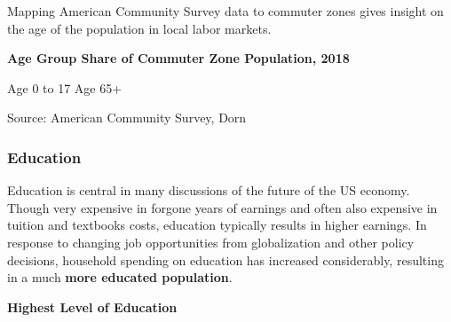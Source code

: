 \documentclass{report}
\newcommand{\tbllink}[1]{\href{https://raw.githubusercontent.com/bdecon/US-chartbook/master/chartbook/data/#1}{\faTable}}
\begin{document}
{{{\vspace{2mm}


\begin{minipage}{0.76\textwidth}
\small Mapping American Community Survey data to commuter zones gives insight on the age of the population in local labor markets.  \\



\end{minipage}
\vspace{3mm}

\noindent \normalsize \textbf{Age Group Share of Commuter Zone Population, 2018}

\hspace{2mm} Age 0 to 17 \hspace{62mm} Age 65+

\vspace{-3mm}
\hspace{-9mm}  \hspace{-3mm} 

\vspace{-3mm}
\footnotesize{Source: American Community Survey, Dorn} \hspace{61mm} \tbllink{acs_cz_age.csv}




\newpage


\begin{minipage}{0.76\textwidth}

\subsubsection*{\color{black!70} \seriffont Education}

\small Education is central in many discussions of the future of the US economy. Though very expensive in forgone years of earnings and often also expensive in tuition and textbooks costs, education typically results in higher earnings. In response to changing job opportunities from globalization and other policy decisions, household spending on education has increased considerably, resulting in a much \textbf{more educated population}.

\end{minipage}

\vspace{2mm}

\begin{minipage}{0.33\textwidth}
\small  
\end{minipage}\hspace{6mm}
\begin{minipage}{0.39\textwidth}
\normalsize \textbf{Highest Level of Education}


\end{minipage}}}}
\end{document}
